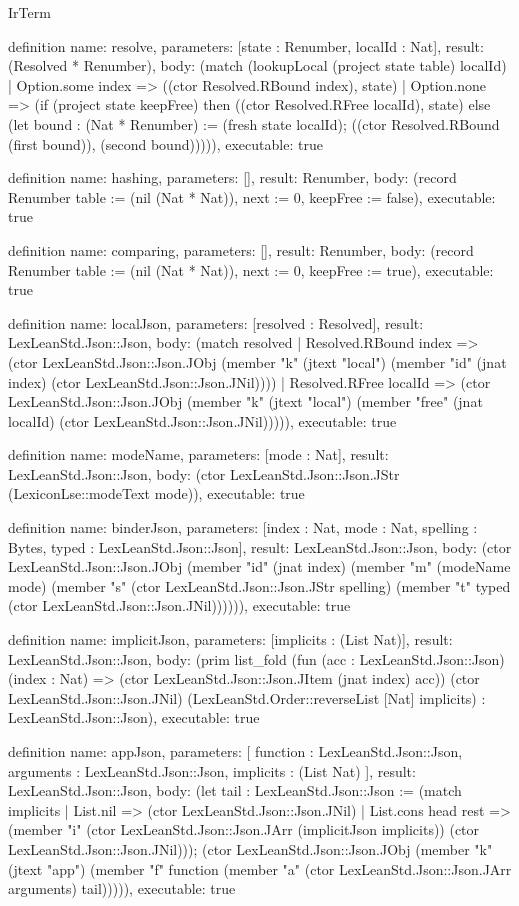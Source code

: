 \begin{lexlean}{IrTerm}
\begin{semanticmodule}
definition{
  name: resolve,
  parameters: [state : Renumber, localId : Nat],
  result: (Resolved * Renumber),
  body: (match (lookupLocal (project state table) localId)
    | Option.some index => ((ctor Resolved.RBound index), state)
    | Option.none => (if (project state keepFree) then ((ctor Resolved.RFree localId), state) else (let bound : (Nat * Renumber) := (fresh state localId); ((ctor Resolved.RBound (first bound)), (second bound))))),
  executable: true
}

definition{
  name: hashing,
  parameters: [],
  result: Renumber,
  body: (record Renumber {table := (nil (Nat * Nat)), next := 0, keepFree := false}),
  executable: true
}

definition{
  name: comparing,
  parameters: [],
  result: Renumber,
  body: (record Renumber {table := (nil (Nat * Nat)), next := 0, keepFree := true}),
  executable: true
}

definition{
  name: localJson,
  parameters: [resolved : Resolved],
  result: LexLeanStd.Json::Json,
  body: (match resolved
    | Resolved.RBound index => (ctor LexLeanStd.Json::Json.JObj (member "k" (jtext "local") (member "id" (jnat index) (ctor LexLeanStd.Json::Json.JNil))))
    | Resolved.RFree localId => (ctor LexLeanStd.Json::Json.JObj (member "k" (jtext "local") (member "free" (jnat localId) (ctor LexLeanStd.Json::Json.JNil))))),
  executable: true
}

definition{
  name: modeName,
  parameters: [mode : Nat],
  result: LexLeanStd.Json::Json,
  body: (ctor LexLeanStd.Json::Json.JStr (LexiconLse::modeText mode)),
  executable: true
}

definition{
  name: binderJson,
  parameters: [index : Nat, mode : Nat, spelling : Bytes, typed : LexLeanStd.Json::Json],
  result: LexLeanStd.Json::Json,
  body: (ctor LexLeanStd.Json::Json.JObj (member "id" (jnat index) (member "m" (modeName mode) (member "s" (ctor LexLeanStd.Json::Json.JStr spelling) (member "t" typed (ctor LexLeanStd.Json::Json.JNil)))))),
  executable: true
}

definition{
  name: implicitJson,
  parameters: [implicits : (List Nat)],
  result: LexLeanStd.Json::Json,
  body: (prim list_fold (fun (acc : LexLeanStd.Json::Json) (index : Nat) => (ctor LexLeanStd.Json::Json.JItem (jnat index) acc)) (ctor LexLeanStd.Json::Json.JNil) (LexLeanStd.Order::reverseList [Nat] implicits) : LexLeanStd.Json::Json),
  executable: true
}

definition{
  name: appJson,
  parameters: [
    function : LexLeanStd.Json::Json,
    arguments : LexLeanStd.Json::Json,
    implicits : (List Nat)
  ],
  result: LexLeanStd.Json::Json,
  body: (let tail : LexLeanStd.Json::Json := (match implicits
    | List.nil => (ctor LexLeanStd.Json::Json.JNil)
    | List.cons head rest => (member "i" (ctor LexLeanStd.Json::Json.JArr (implicitJson implicits)) (ctor LexLeanStd.Json::Json.JNil))); (ctor LexLeanStd.Json::Json.JObj (member "k" (jtext "app") (member "f" function (member "a" (ctor LexLeanStd.Json::Json.JArr arguments) tail))))),
  executable: true
}


\end{semanticmodule}
\end{lexlean}
